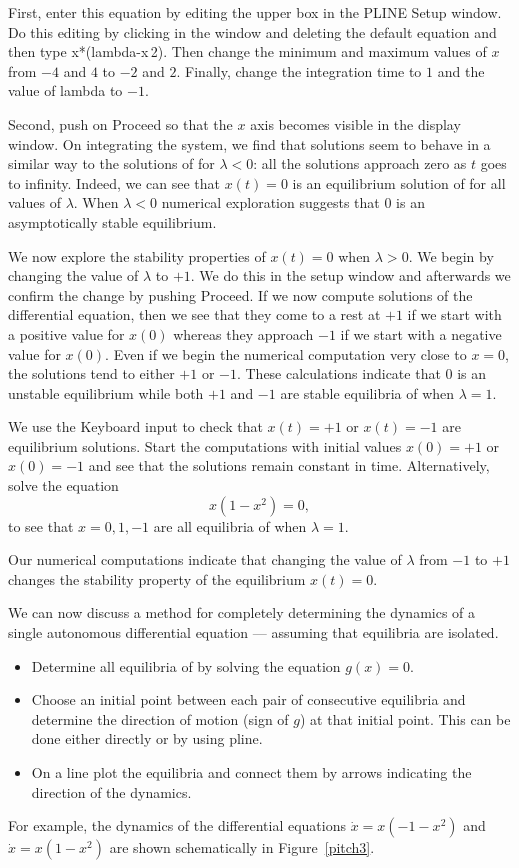 \documentclass{ximera}
\begin{document}
First, enter this equation by editing the upper box in the 
{\sf PLINE Setup} window.  Do this editing by clicking in 
the window and deleting the default equation and then type 
{\sf x*(lambda-x\^{$\,\!$}2)}.  Then change the minimum 
and maximum values of $x$ from $-4$ and $4$ to $-2$ and $2$.  
Finally, change the integration time to $1$ and the value
of {\sf lambda} to $-1$.  

Second,  push on {\sf Proceed} so that the $x$ axis becomes 
visible in the display window.
On integrating the system, we find that solutions seem
to behave in a similar way to the solutions of  for
$\lambda < 0$: all the solutions approach zero as $t$ goes to
infinity.  Indeed, we can see that $x(t)=0$ is an equilibrium
solution of  for all values of $\lambda$.  When
$\lambda<0$ numerical exploration suggests that $0$ is an
asymptotically stable equilibrium.

We now explore the stability properties of $x(t)=0$ when
$\lambda >0$.  We begin by changing the value of $\lambda$ to
$+1$.  We do this in the setup window and afterwards we confirm
the change by pushing {\sf Proceed}.  If we now compute
solutions of the differential equation, then we see that they
come to a rest at $+1$ if we start with a positive value for
$x(0)$ whereas they approach $-1$ if we start with a negative
value for $x(0)$.  Even if we begin the numerical computation
very close to $x=0$, the solutions tend to either $+1$ or $-1$.
These calculations indicate that $0$ is an unstable equilibrium
while both $+1$ and $-1$ are stable equilibria of 
when $\lambda =1$.

We use the {\sf Keyboard input} to check that $x(t) = +1$ or
$x(t) = -1$ are equilibrium solutions.  Start the computations
with initial values $x(0) = +1$ or $x(0) = -1$ and see that the
solutions remain constant in time.  Alternatively, solve the
equation
\[
x(1-x^2) = 0,
\]
to see that $x=0,1,-1$ are all equilibria of  when
$\lambda=1$.

Our numerical computations indicate that changing the
value of $\lambda$ from $-1$ to $+1$ changes the stability
property of the equilibrium $x(t)=0$.

We can now discuss a method for completely determining the
dynamics of a single autonomous differential equation 
--- assuming that equilibria are isolated.

\begin{itemize}
\item Determine all equilibria of  by solving the
equation $g(x)=0$.
\item Choose an initial point between each pair of consecutive
equilibria and determine the direction of motion (sign of $g$) at
that initial point. This can be done either directly or by using
{\sf pline}.
\item On a line plot the equilibria  and
connect them by arrows indicating the direction of the dynamics.
\end{itemize}
For example, the dynamics of the differential equations $\dot{x}
= x(-1-x^2)$ and $\dot{x} = x(1-x^2)$ are shown schematically in
Figure~\ref{pitch3}.
\end{document}
